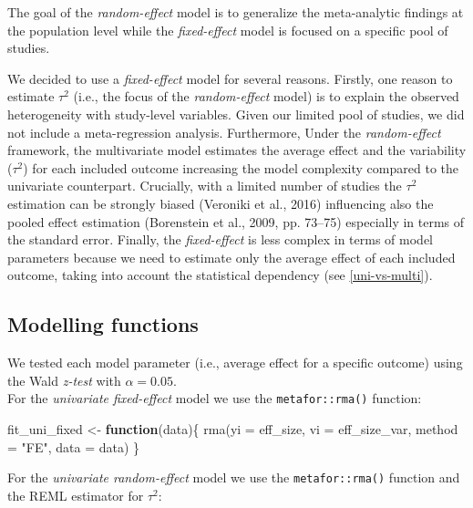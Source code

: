 \documentclass[
]{article}
\newenvironment{Shaded}{\begin{snugshade}}{\end{snugshade}}
\newcommand{\AttributeTok}[1]{\textcolor[rgb]{0.77,0.63,0.00}{#1}}
\newcommand{\ControlFlowTok}[1]{\textcolor[rgb]{0.13,0.29,0.53}{\textbf{#1}}}
\newcommand{\FunctionTok}[1]{\textcolor[rgb]{0.00,0.00,0.00}{#1}}
\newcommand{\NormalTok}[1]{#1}
\newcommand{\OtherTok}[1]{\textcolor[rgb]{0.56,0.35,0.01}{#1}}
\newcommand{\StringTok}[1]{\textcolor[rgb]{0.31,0.60,0.02}{#1}}
\begin{document}
The goal of the \emph{random-effect} model is to generalize the meta-analytic findings at the population level while the \emph{fixed-effect} model is focused on a specific pool of studies.

We decided to use a \emph{fixed-effect} model for several reasons. Firstly, one reason to estimate \(\tau^2\) (i.e., the focus of the \emph{random-effect} model) is to explain the observed heterogeneity with study-level variables. Given our limited pool of studies, we did not include a meta-regression analysis. Furthermore, Under the \emph{random-effect} framework, the multivariate model estimates the average effect and the variability (\(\tau^2\)) for each included outcome increasing the model complexity compared to the univariate counterpart. Crucially, with a limited number of studies the \(\tau^2\) estimation can be strongly biased (Veroniki et al., 2016) influencing also the pooled effect estimation (Borenstein et al., 2009, pp. 73--75) especially in terms of the standard error. Finally, the \emph{fixed-effect} is less complex in terms of model parameters because we need to estimate only the average effect of each included outcome, taking into account the statistical dependency (see \ref{uni-vs-multi}).

\hypertarget{modelling-functions}{%
\subsection{Modelling functions}\label{modelling-functions}}

We tested each model parameter (i.e., average effect for a specific outcome) using the Wald \emph{z-test} with \(\alpha = 0.05\).\\
For the \emph{univariate fixed-effect} model we use the \texttt{metafor::rma()} function:

\begin{Shaded}
\begin{Highlighting}[]
\NormalTok{fit\_uni\_fixed }\OtherTok{\textless{}{-}} \ControlFlowTok{function}\NormalTok{(data)\{}
    \FunctionTok{rma}\NormalTok{(}\AttributeTok{yi =}\NormalTok{ eff\_size, }
        \AttributeTok{vi =}\NormalTok{ eff\_size\_var,}
        \AttributeTok{method =} \StringTok{"FE"}\NormalTok{,}
        \AttributeTok{data =}\NormalTok{ data)}
\NormalTok{\}}
\end{Highlighting}
\end{Shaded}

For the \emph{univariate random-effect} model we use the \texttt{metafor::rma()} function and the REML estimator for \(\tau^2\):
\end{document}
